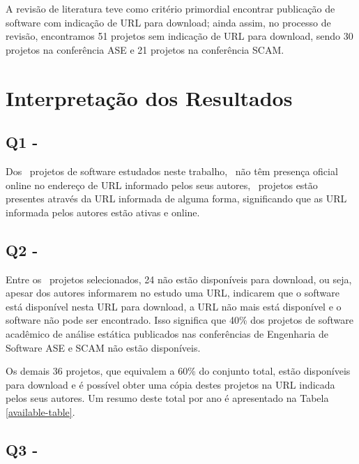 \begin{description}
A revisão de literatura teve como critério primordial encontrar publicação de
software com indicação de URL para download; ainda assim, no processo de
revisão, encontramos 51 projetos sem indicação de URL para download, sendo 30 projetos
na conferência ASE e 21 projetos na conferência SCAM.

\end{description}


\section{Interpretação dos Resultados} \label{estudo1:interpretacao} %

\subsection{Q1 - \EstudoUmQuestaoUm} %

Dos \SoftwareCount \ projetos de software estudados neste trabalho, \SoftwareUrlNotAvailableCount \ não têm presença
oficial online no endereço de URL informado pelos seus autores, \SoftwareUrlAvailableCount \ projetos
estão presentes através da URL informada de alguma forma, significando que as
URL informada pelos autores estão ativas e online.

\subsection{Q2 - \EstudoUmQuestaoDois} %

Entre os \SoftwareCount \ projetos selecionados, 24 não estão disponíveis para download, ou
seja, apesar dos autores informarem no estudo uma URL, indicarem que o software
está disponível nesta URL para download, a URL não mais está disponível e o
software não pode ser encontrado. Isso significa que 40\% dos projetos de software
acadêmico de análise estática publicados nas conferências de Engenharia de
Software ASE e SCAM não estão disponíveis.

Os demais 36 projetos, que equivalem a 60\% do conjunto total, estão
disponíveis para download e é possível obter uma cópia destes projetos na URL
indicada pelos seus autores. Um resumo deste total por ano é apresentado na
Tabela \ref{available-table}.



\subsection{Q3 - \EstudoUmQuestaoTres} %

